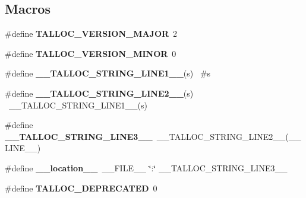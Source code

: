 \subsection*{Macros}
\begin{DoxyCompactItemize}
\item 
\hypertarget{group__talloc_gaa1b665edcef3b29a36bdbaa5f95092be}{}\#define {\bfseries T\+A\+L\+L\+O\+C\+\_\+\+V\+E\+R\+S\+I\+O\+N\+\_\+\+M\+A\+J\+O\+R}~2\label{group__talloc_gaa1b665edcef3b29a36bdbaa5f95092be}

\item 
\hypertarget{group__talloc_ga3028a11b933199eb0b332cd176e8253f}{}\#define {\bfseries T\+A\+L\+L\+O\+C\+\_\+\+V\+E\+R\+S\+I\+O\+N\+\_\+\+M\+I\+N\+O\+R}~0\label{group__talloc_ga3028a11b933199eb0b332cd176e8253f}

\item 
\hypertarget{group__talloc_ga2aca6cf6b79367d4d8459566324ec078}{}\#define {\bfseries \+\_\+\+\_\+\+T\+A\+L\+L\+O\+C\+\_\+\+S\+T\+R\+I\+N\+G\+\_\+\+L\+I\+N\+E1\+\_\+\+\_\+}(s)    ~\#s\label{group__talloc_ga2aca6cf6b79367d4d8459566324ec078}

\item 
\hypertarget{group__talloc_gab0c050d4373e4d8b421a20230dc67095}{}\#define {\bfseries \+\_\+\+\_\+\+T\+A\+L\+L\+O\+C\+\_\+\+S\+T\+R\+I\+N\+G\+\_\+\+L\+I\+N\+E2\+\_\+\+\_\+}(s)  ~\+\_\+\+\_\+\+T\+A\+L\+L\+O\+C\+\_\+\+S\+T\+R\+I\+N\+G\+\_\+\+L\+I\+N\+E1\+\_\+\+\_\+(s)\label{group__talloc_gab0c050d4373e4d8b421a20230dc67095}

\item 
\hypertarget{group__talloc_ga089300cc411713199beb2905ac62929a}{}\#define {\bfseries \+\_\+\+\_\+\+T\+A\+L\+L\+O\+C\+\_\+\+S\+T\+R\+I\+N\+G\+\_\+\+L\+I\+N\+E3\+\_\+\+\_\+}~\+\_\+\+\_\+\+T\+A\+L\+L\+O\+C\+\_\+\+S\+T\+R\+I\+N\+G\+\_\+\+L\+I\+N\+E2\+\_\+\+\_\+(\+\_\+\+\_\+\+L\+I\+N\+E\+\_\+\+\_\+)\label{group__talloc_ga089300cc411713199beb2905ac62929a}

\item 
\hypertarget{group__talloc_ga2102830a39706812c27290bec32a9259}{}\#define {\bfseries \+\_\+\+\_\+location\+\_\+\+\_\+}~\+\_\+\+\_\+\+F\+I\+L\+E\+\_\+\+\_\+ \char`\"{}\+:\char`\"{} \+\_\+\+\_\+\+T\+A\+L\+L\+O\+C\+\_\+\+S\+T\+R\+I\+N\+G\+\_\+\+L\+I\+N\+E3\+\_\+\+\_\+\label{group__talloc_ga2102830a39706812c27290bec32a9259}

\item 
\hypertarget{group__talloc_gaec69750b797d06c6dec94862d19736e3}{}\#define {\bfseries T\+A\+L\+L\+O\+C\+\_\+\+D\+E\+P\+R\+E\+C\+A\+T\+E\+D}~0\label{group__talloc_gaec69750b797d06c6dec94862d19736e3}


\end{DoxyCompactItemize}
